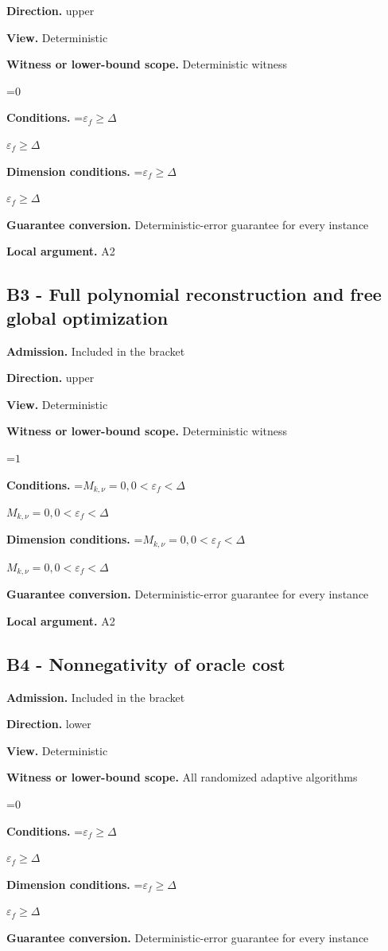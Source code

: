 \documentclass[10pt,a4paper]{article}
\newcommand{\AtlasMath}[1]{\par\begingroup\centering\setbox0=\hbox{$\displaystyle #1$}\ifdim\wd0>1.4\linewidth\typeout{ATLAS WIDE FORMULA: \the\wd0}\fi\ifdim\wd0>\linewidth\resizebox{\linewidth}{!}{\box0}\else\box0\fi\par\endgroup}
\newcommand{\AtlasInlineMath}[1]{\begingroup\setbox0=\hbox{$#1$}\ifdim\wd0>.4\linewidth\endgroup\AtlasMath{#1}\else\endgroup$#1$\fi}
\begin{document}
\textbf{Direction.} upper

\textbf{View.} Deterministic

\textbf{Witness or lower-bound scope.} Deterministic witness

\AtlasMath{0}
\textbf{Conditions.} \AtlasInlineMath{\varepsilon_f\ge \Delta}

\textbf{Dimension conditions.} \AtlasInlineMath{\varepsilon_f\ge \Delta}

\textbf{Guarantee conversion.} Deterministic-error guarantee for every instance

\textbf{Local argument.} A2

\subsection{B3 - Full polynomial reconstruction and free global optimization}
\textbf{Admission.} Included in the bracket

\textbf{Direction.} upper

\textbf{View.} Deterministic

\textbf{Witness or lower-bound scope.} Deterministic witness

\AtlasMath{1}
\textbf{Conditions.} \AtlasInlineMath{M_{k,\nu}=0,0<\varepsilon_f<\Delta}

\textbf{Dimension conditions.} \AtlasInlineMath{M_{k,\nu}=0,0<\varepsilon_f<\Delta}

\textbf{Guarantee conversion.} Deterministic-error guarantee for every instance

\textbf{Local argument.} A2

\subsection{B4 - Nonnegativity of oracle cost}
\textbf{Admission.} Included in the bracket

\textbf{Direction.} lower

\textbf{View.} Deterministic

\textbf{Witness or lower-bound scope.} All randomized adaptive algorithms

\AtlasMath{0}
\textbf{Conditions.} \AtlasInlineMath{\varepsilon_f\ge \Delta}

\textbf{Dimension conditions.} \AtlasInlineMath{\varepsilon_f\ge \Delta}

\textbf{Guarantee conversion.} Deterministic-error guarantee for every instance
\end{document}

